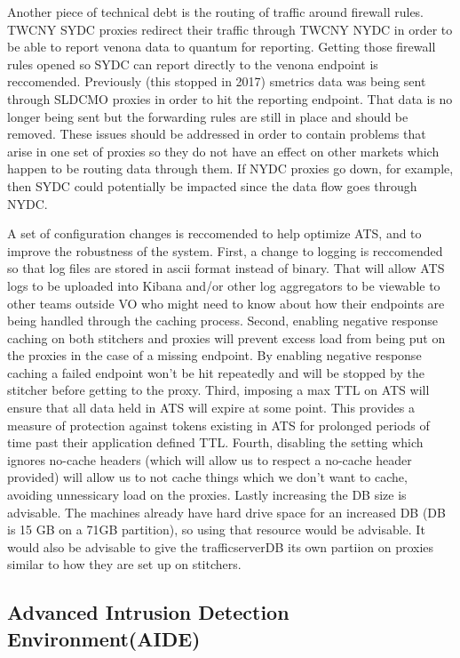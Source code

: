 \documentclass{article}
\begin{document}
Another piece of technical debt is the routing of traffic around firewall rules. TWCNY SYDC proxies redirect their traffic through TWCNY NYDC in order to be able to report venona data to quantum for reporting. Getting those firewall rules opened so SYDC can report directly to the venona endpoint is reccomended. Previously (this stopped in 2017) smetrics data was being sent through SLDCMO proxies in order to hit the reporting endpoint. That data is no longer being sent but the forwarding rules are still in place and should be removed. These issues should be addressed in order to contain problems that arise in one set of proxies so they do not have an effect on other markets which happen to be routing data through them. If NYDC proxies go down, for example, then SYDC could potentially be impacted since the data flow goes through NYDC.  

A set of configuration changes is reccomended to help optimize ATS, and to improve the robustness of the system. First, a change to logging is reccomended so that log files are stored in ascii format instead of binary. That will allow ATS logs to be uploaded into Kibana and/or other log aggregators to be viewable to other teams outside VO who might need to know about how their endpoints are being handled through the caching process. Second, enabling negative response caching on both stitchers and proxies will prevent excess load from being put on the proxies in the case of a missing endpoint. By enabling negative response caching a failed endpoint won't be hit repeatedly and will be stopped by the stitcher before getting to the proxy. Third, imposing a max TTL on ATS will ensure that all data held in ATS will expire at some point. This provides a measure of protection against tokens existing in ATS for prolonged periods of time past their application defined TTL. Fourth, disabling the setting which ignores no-cache headers (which will allow us to respect a no-cache header provided) will allow us to not cache things which we don't want to cache, avoiding unnessicary load on the proxies. Lastly increasing the DB size is advisable. The machines already have hard drive space for an increased DB (DB is 15 GB on a 71GB partition), so using that resource would be advisable. It would also be advisable to give the trafficserverDB its own partiion on proxies similar to how they are set up on stitchers. 



\subsection{Advanced Intrusion Detection Environment(AIDE)}
\label{SECTION-AIDE}
\end{document}
